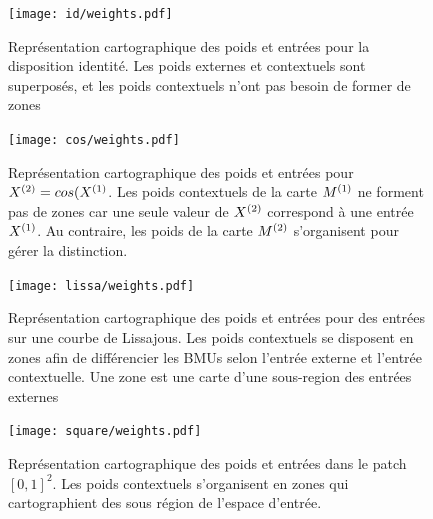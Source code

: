 \documentclass[../main]{subfiles}
\begin{document}
\begin{figure}[H]
	\centering\texttt{[image: id/weights.pdf]}
	\vspace{-0.3cm}
	\caption{Représentation cartographique des poids et entrées pour la disposition identité. Les poids externes et contextuels sont superposés, et les poids contextuels n'ont pas besoin de former de zones \label{fig:id_results}}
\end{figure}
\begin{figure}[H]
	\centering\texttt{[image: cos/weights.pdf]}
	\vspace{-0.3cm}
	\caption{Représentation cartographique des poids et entrées pour $X^{({2})} = cos(X^{({1})}$. Les poids contextuels de la carte $M^{({1})}$ ne forment pas de zones car une seule valeur de $X^{({2})}$ correspond à une entrée $X^{({1})}$. Au contraire, les poids de la carte $M^{({2})}$ s'organisent pour gérer la distinction. \label{fig:cos_results}}
\end{figure}
\begin{figure}[H]
	\centering\texttt{[image: lissa/weights.pdf]}
	\vspace{-0.3cm}
	\caption{Représentation cartographique des poids et entrées pour des entrées sur une courbe de Lissajous. Les poids contextuels se disposent en zones afin de différencier les BMUs selon l'entrée externe et l'entrée contextuelle. Une zone est une carte d'une sous-region des entrées externes \label{fig:lissa}}
\end{figure}

\begin{figure}[ht]
	\centering\texttt{[image: square/weights.pdf]}
	\caption{Représentation cartographique des poids et entrées dans le patch $[0,1]^2$. Les poids contextuels s'organisent en zones qui cartographient des sous région de l'espace d'entrée. \label{fig:ind}}
\end{figure}
\end{document}
